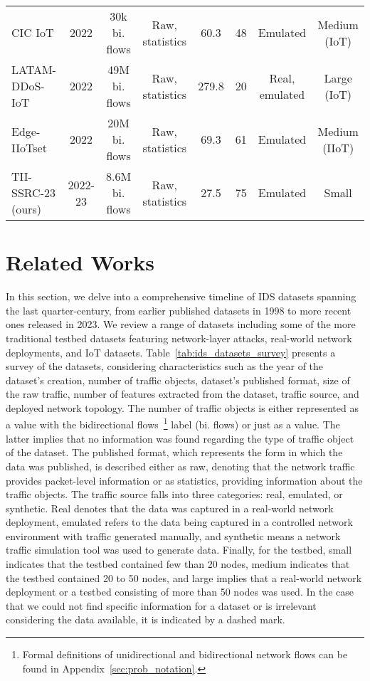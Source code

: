 \documentclass[lettersize,journal]{IEEEtran}
\begin{document}
\begin{table*}[t]
\begin{tabularx}{\textwidth}{l>{\hsize=1.23cm}CCC>{\hsize=1.25cm}C>{\hsize=1.15cm}C>{\hsize=2.3cm}C>{\hsize=2.6cm}C}
        CIC IoT & 2022 & 30k bi. flows & Raw, statistics & 60.3  & 48 & Emulated & Medium (IoT) \\
        LATAM-DDoS-IoT & 2022 & 49M bi. flows & Raw, statistics & 279.8 & 20 & Real, emulated & Large (IoT) \\
        Edge-IIoTset & 2022 & 20M bi. flows & Raw, statistics & 69.3 & 61 & Emulated & Medium (IIoT) \\ 
        \midrule
        TII-SSRC-23 (ours) & 2022-23 & 8.6M bi. flows & Raw, statistics & 27.5 & 75 & Emulated & Small \\
        \bottomrule
    \end{tabularx}
\end{table*}



\section{Related Works} \label{sec:related}

In this section, we delve into a comprehensive timeline of IDS datasets spanning the last quarter-century, from earlier published datasets in 1998 to more recent ones released in 2023. We review a range of datasets including some of the more traditional testbed datasets featuring network-layer attacks, real-world network deployments, and IoT datasets. Table~\ref{tab:ids_datasets_survey} presents a survey of the datasets, considering characteristics such as the year of the dataset's creation, number of traffic objects, dataset's published format, size of the raw traffic, number of features extracted from the dataset, traffic source, and deployed network topology. The number of traffic objects is either represented as a value with the bidirectional flows~\footnote{Formal definitions of unidirectional and bidirectional network flows can be found in Appendix~\ref{sec:prob_notation}.} label (bi. flows) or just as a value. The latter implies that no information was found regarding the type of traffic object of the dataset. The published format, which represents the form in which the data was published, is described either as raw, denoting that the network traffic provides packet-level information or as statistics, providing information about the traffic objects. The traffic source falls into three categories: real, emulated, or synthetic. Real denotes that the data was captured in a real-world network deployment, emulated refers to the data being captured in a controlled network environment with traffic generated manually, and synthetic means a network traffic simulation tool was used to generate data. Finally, for the testbed, small indicates that the testbed contained few than 20 nodes, medium indicates that the testbed contained 20 to 50 nodes, and large implies that a real-world network deployment or a testbed consisting of more than 50 nodes was used. In the case that we could not find specific information for a dataset or is irrelevant considering the data available, it is indicated by a dashed mark. 
\end{document}

